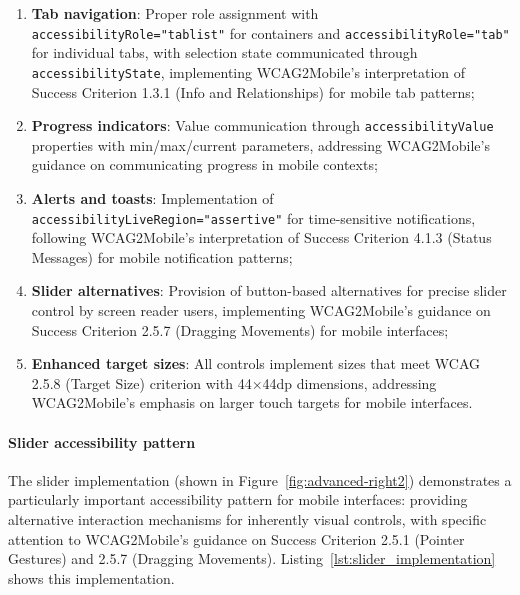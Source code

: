 \begin{enumerate}
    \item \textbf{Tab navigation}: Proper role assignment with \texttt{accessibilityRole="tablist"} for containers and \texttt{accessibilityRole="tab"} for individual tabs, with selection state communicated through \texttt{accessibilityState}, implementing WCAG2Mobile's interpretation of Success Criterion 1.3.1 (Info and Relationships) for mobile tab patterns;
    
    \item \textbf{Progress indicators}: Value communication through \texttt{accessibilityValue} properties with min/max/current parameters, addressing WCAG2Mobile's guidance on communicating progress in mobile contexts;
    
    \item \textbf{Alerts and toasts}: Implementation of \texttt{accessibilityLiveRegion="assertive"} for time-sensitive notifications, following WCAG2Mobile's interpretation of Success Criterion 4.1.3 (Status Messages) for mobile notification patterns;
    
    \item \textbf{Slider alternatives}: Provision of button-based alternatives for precise slider control by screen reader users, implementing WCAG2Mobile's guidance on Success Criterion 2.5.7 (Dragging Movements) for mobile interfaces;
    
    \item \textbf{Enhanced target sizes}: All controls implement sizes that meet WCAG 2.5.8 (Target Size) criterion with 44×44dp dimensions, addressing WCAG2Mobile's emphasis on larger touch targets for mobile interfaces.
\end{enumerate}

\paragraph{Slider accessibility pattern}

The slider implementation (shown in Figure~\ref{fig:advanced-right2}) demonstrates a particularly important accessibility pattern for mobile interfaces: providing alternative interaction mechanisms for inherently visual controls, with specific attention to WCAG2Mobile's guidance on Success Criterion 2.5.1 (Pointer Gestures) and 2.5.7 (Dragging Movements). Listing~\ref{lst:slider_implementation} shows this implementation.

